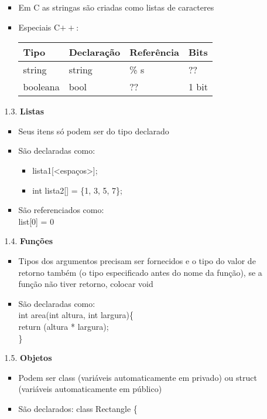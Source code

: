 \documentclass[12pt, a4paper]{article} %
\begin{document}
\begin{enumerate}
\begin{enumerate}
\begin{itemize}
\begin{center}
\begin{tabular}{ | p{4cm} | l | l | l |}
\end{tabular}
\end{center}
\item Em C as stringas são criadas como listas de caracteres
\item Especiais C$++$:
\begin{center}
\begin{tabular}{ | l | l | l | l |} \hline 
Tipo & Declaração & Referência & Bits \\ \hline
string & string & \% s & ?? \\ \hline
booleana & bool & ?? & 1 bit\\ \hline
\end{tabular}
\end{center}
\end{itemize}
\item[1.3.] \textbf{Listas}
\begin{itemize}
\item Seus itens só podem ser do tipo declarado
\item São declaradas como: 
\begin{itemize}
\item <tipo da lista> lista1[<espaços>]; 
\item int lista2[] = \{1, 3, 5, 7\};
\end{itemize} 
\item São referenciados como: \\
list[0] = 0
\end{itemize}
\item[1.4.] \textbf{Funções}
\begin{itemize}
\item Tipos dos argumentos precisam ser fornecidos e o tipo do valor de retorno também (o tipo especificado antes do nome da função), se a função não tiver retorno, colocar void
\item São declaradas como: \\
int area(int altura, int largura)\{ \\[-0.5cm]

\setlength{\parindent}{1cm} return (altura * largura);\\
\}
\end{itemize}
\item[1.5.] \textbf{Objetos}
\begin{itemize}
\item Podem ser class (variáveis automaticamente em privado) ou struct (variáveis automaticamente em público)
\item São declarados:
class Rectangle \{ \\[-0.5cm]


\end{itemize}
\end{enumerate}
\end{enumerate}
\end{document}
